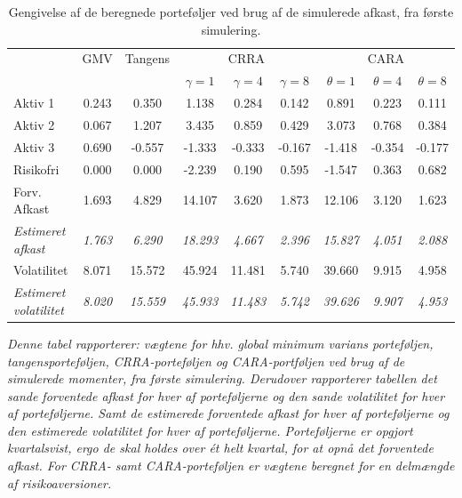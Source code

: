 \documentclass[
  a4paper,
  oneside]{memoir}
\begin{document}
\begin{table}[H]

\caption{\label{tab:sum-1}Gengivelse af de beregnede porteføljer ved brug af de simulerede afkast, fra første simulering.}
\centering
\begin{threeparttable}
\begin{tabular}[t]{lcccccccc}
\toprule
\multicolumn{1}{c}{ } & \multicolumn{1}{c}{GMV} & \multicolumn{1}{c}{Tangens} & \multicolumn{3}{c}{CRRA} & \multicolumn{3}{c}{CARA} \\
\cmidrule(l{3pt}r{3pt}){2-2} \cmidrule(l{3pt}r{3pt}){3-3} \cmidrule(l{3pt}r{3pt}){4-6} \cmidrule(l{3pt}r{3pt}){7-9}
  &   &   & $\gamma=1$ & $\gamma=4$ & $\gamma=8$ & $\theta=1$ & $\theta=4$ & $\theta=8$\\
\midrule
\rowcolor{gray!6}  Aktiv 1 & 0.243 & 0.350 & 1.138 & 0.284 & 0.142 & 0.891 & 0.223 & 0.111\\
Aktiv 2 & 0.067 & 1.207 & 3.435 & 0.859 & 0.429 & 3.073 & 0.768 & 0.384\\
\rowcolor{gray!6}  Aktiv 3 & 0.690 & -0.557 & -1.333 & -0.333 & -0.167 & -1.418 & -0.354 & -0.177\\
Risikofri & 0.000 & 0.000 & -2.239 & 0.190 & 0.595 & -1.547 & 0.363 & 0.682\\
\rowcolor{gray!6}  Forv. Afkast & 1.693 & 4.829 & 14.107 & 3.620 & 1.873 & 12.106 & 3.120 & 1.623\\
\em{Estimeret afkast} & \em{1.763} & \em{6.290} & \em{18.293} & \em{4.667} & \em{2.396} & \em{15.827} & \em{4.051} & \em{2.088}\\
\rowcolor{gray!6}  Volatilitet & 8.071 & 15.572 & 45.924 & 11.481 & 5.740 & 39.660 & 9.915 & 4.958\\
\em{Estimeret volatilitet} & \em{8.020} & \em{15.559} & \em{45.933} & \em{11.483} & \em{5.742} & \em{39.626} & \em{9.907} & \em{4.953}\\
\bottomrule
\end{tabular}
\begin{tablenotes}
\item \textit{Denne tabel rapporterer: vægtene for hhv. global minimum varians porteføljen, tangensporteføljen, CRRA-porteføljen og CARA-portføljen ved brug af de simulerede momenter, fra første simulering. Derudover rapporterer tabellen det sande forventede afkast for hver af porteføljerne og den sande volatilitet for hver af porteføljerne.  Samt de estimerede forventede afkast for hver af porteføljerne og den estimerede volatilitet for hver af porteføljerne. Porteføljerne er opgjort kvartalsvist, ergo de skal holdes over ét helt kvartal, for at opnå det forventede afkast. For CRRA- samt CARA-porteføljen er vægtene beregnet for en delmængde af risikoaversioner.}
\end{tablenotes}
\end{threeparttable}
\end{table}
\end{document}
